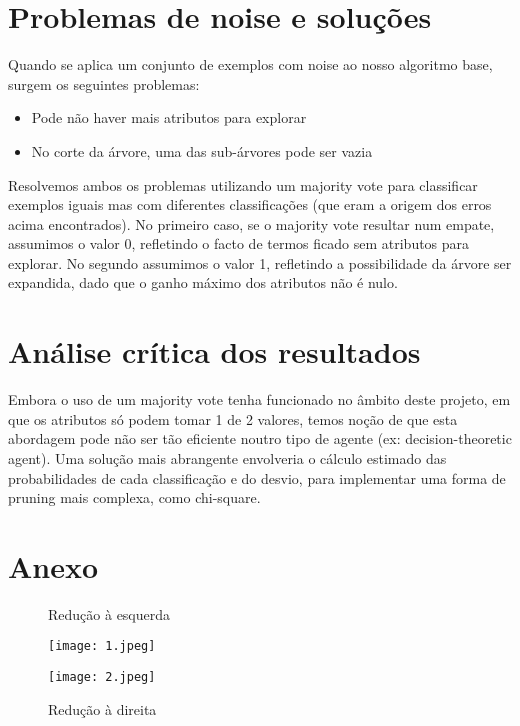 \documentclass[12pt]{article}
\begin{document}
\section{Problemas de noise e soluções}
Quando se aplica um conjunto de exemplos com noise ao nosso algoritmo base,
surgem os seguintes problemas:
\begin{itemize}
    \item Pode não haver mais atributos para explorar
    \item No corte da árvore, uma das sub-árvores pode ser vazia
\end{itemize}
Resolvemos ambos os problemas utilizando um majority vote para classificar 
exemplos iguais mas com diferentes classificações (que eram a origem dos erros 
acima encontrados). No primeiro caso, se o majority vote resultar num empate, 
assumimos o valor 0, refletindo o facto de termos ficado sem atributos para 
explorar. No segundo assumimos o valor 1, refletindo a possibilidade da árvore 
ser expandida, dado que o ganho máximo dos atributos não é nulo.
\section{Análise crítica dos resultados}
Embora o uso de um majority vote tenha funcionado no âmbito deste projeto, em 
que os atributos só podem tomar 1 de 2 valores, temos noção de que esta 
abordagem pode não ser tão eficiente noutro tipo de agente 
(ex: decision-theoretic agent). Uma solução mais abrangente envolveria o cálculo 
estimado das probabilidades de cada classificação e do desvio, para implementar 
uma forma de pruning mais complexa, como chi-square.

\newpage
\section{Anexo}
\begin{figure}[!htb]
  \caption{Redução à esquerda}
  \texttt{[image: 1.jpeg]}
  \caption{Redução à direita}
  \texttt{[image: 2.jpeg]}
\end{figure}
\end{document}
